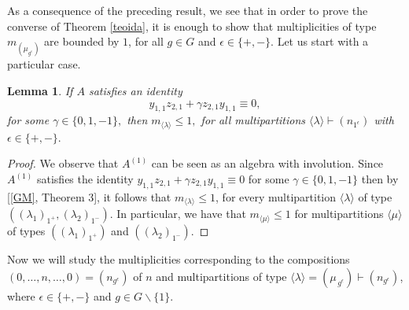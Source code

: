 \documentclass{amsart}
\newtheorem{lema}[teorema]{Lemma}
\numberwithin{equation}{section}
\begin{document}
As a consequence of the preceding result, we see that in order to prove the converse of Theorem \ref{teoida}, it is enough to show that multiplicities of type $m_{(\mu_{ g^\epsilon})}$ are bounded by $1$, for all $g\in G$ and $\epsilon\in \{+,-\}$. Let us start with a particular case.	

\begin{lema}\label{lema0F} 
 If $A$ satisfies an identity $$y_{1,1}z_{2,1}+\gamma z_{2,1}y_{1,1}\equiv 0,$$ 
	for some $\gamma \in \{0, 1, -1\},$ then $m_{\langle \lambda \rangle} \le 1,$ for all multipartitions  $\langle \lambda \rangle \vdash (n_{1^\epsilon})$ with $\epsilon\in\{+,-\}.$
\end{lema} 

\begin{proof} We observe that $A^{(1)}$ can be seen as an algebra with involution. Since $A^{(1)}$ satisfies the identity $y_{1,1}z_{2,1}+\gamma z_{2,1}y_{1,1}\equiv 0$  for some $\gamma\in \{0,1,-1\}$ then by [\ref{GM}, Theorem 3], it follows that $m_{\langle \lambda \rangle} \le 1$, for every multipartition $\langle \lambda \rangle$ of type $((\lambda_1)_{1^+},(\lambda_2)_{1^-}).$ In particular, we have that $m_{\langle \mu \rangle} \le 1$ for multipartitions $\langle \mu \rangle $ of types $ ((\lambda_1)_{1^+})$ and $ ( (\lambda_2)_{1^-}).$
\end{proof}

Now we will study the multiplicities corresponding to the compositions $(0, \ldots , n,\ldots , 0 )=(n_{g^{\epsilon}})$ of $n$ and multipartitions of type $\langle \lambda \rangle =(\mu_{\,g^\epsilon})\vdash (n_{g^{\epsilon}})$, where $\epsilon \in \{+,-\}$ and $g\in G\backslash \{1\}$.
\end{document}
